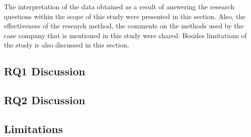 The interpretation of the data obtained as a result of answering the research questions within the scope of this study were presented in this section. Also, the effectiveness of the research method, the comments on the methods used by the case company that is mentioned in this study were shared. Besides limitations of the study is also discussed in this section.

\subsection{RQ1 Discussion}


\subsection{RQ2 Discussion}


\subsection{Limitations}

